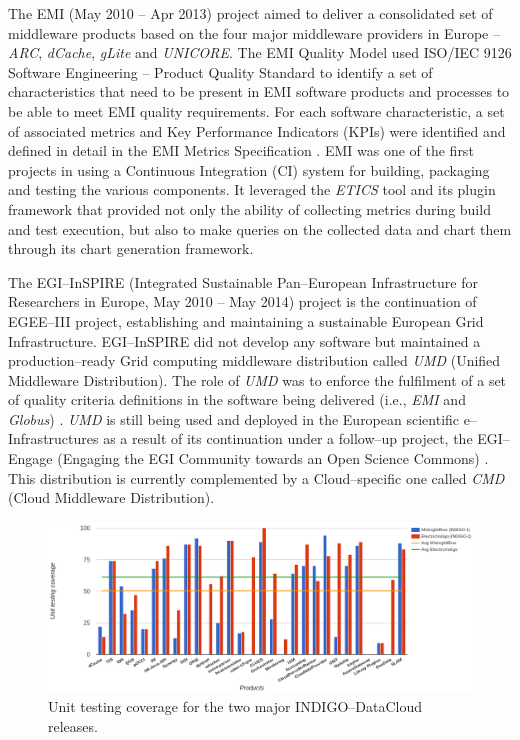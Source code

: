 \documentclass[journal]{IEEEtran}
\begin{document}
The EMI (May 2010 -- Apr 2013) project \cite{cordis:emi} aimed to deliver a consolidated set of middleware products based on the four major middleware providers in Europe -- {\sl ARC}, {\sl dCache}, {\sl gLite} and {\sl UNICORE}. The EMI Quality Model used ISO/IEC 9126 Software Engineering -- Product Quality Standard \cite{iso9126} to identify a set of characteristics that need to be present in EMI software products and processes to be able to meet EMI quality requirements. For each software characteristic, a set of associated metrics and Key Performance Indicators (KPIs) were identified and defined in detail in the EMI Metrics Specification \cite{emi-metrics}. EMI was one of the first projects in using a Continuous Integration (CI) system for building, packaging and testing the various components. It leveraged the {\sl ETICS} tool and its plugin framework that provided not only the ability of collecting metrics during build and test execution, but also to make queries on the collected data and chart them through its chart generation framework.

The EGI--InSPIRE (Integrated Sustainable Pan--European Infrastructure for Researchers in Europe, May 2010 -- May 2014) project \cite{cordis:egi-inspire} is the continuation of EGEE--III project, establishing and maintaining a sustainable European Grid Infrastructure. EGI--InSPIRE did not develop any software but maintained a production--ready Grid computing middleware distribution called {\sl UMD} (Unified Middleware Distribution). The role of {\sl UMD} was to enforce the fulfilment of a set of quality criteria definitions \cite{egi-qc} in the software being delivered (i.e., {\sl EMI} and {\sl Globus}) \cite{mario}. {\sl UMD} is still being used and deployed in the European scientific e--Infrastructures as a result of its continuation under a follow--up project, the EGI--Engage (Engaging the EGI Community towards an Open Science Commons) \cite{cordis:egi-engage}. This distribution is currently complemented by a Cloud--specific one called {\sl CMD} (Cloud Middleware Distribution).

\begin{figure}
\centering
\includegraphics[width=\textwidth]{images/unittest.png}
\caption{Unit testing coverage for the two major INDIGO--DataCloud releases.}
\label{fig:fig_unittest}
\end{figure}
\end{document}
